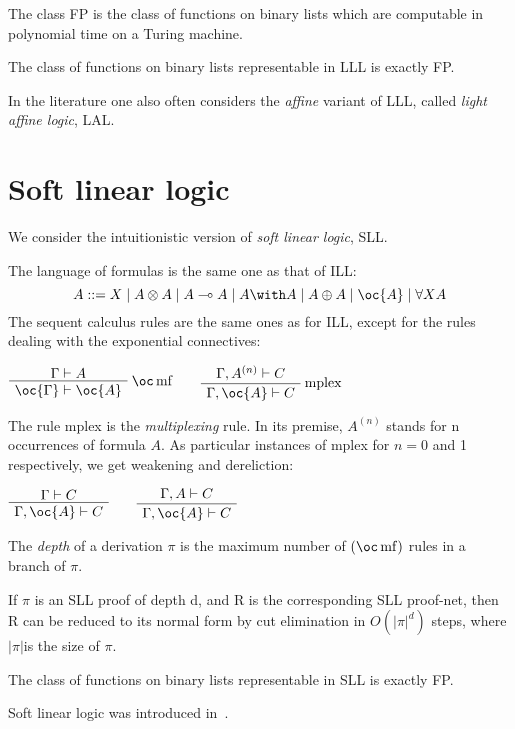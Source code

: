 The class FP is the class of functions on binary lists which are
computable in polynomial time on a Turing machine.

\begin{theorem}
The class of functions on binary lists representable in LLL is exactly FP.
\end{theorem}

In the literature one also often considers the \emph{affine} variant of
LLL, called \emph{light affine logic}, LAL.

\section{Soft linear logic}\label{soft-linear-logic}

We consider the intuitionistic version of \emph{soft linear logic}, SLL.

The language of formulas is the same one as that of ILL:
\begin{equation*}
A ::= X \mid A\tens A \mid A\limp A \mid A\with A \mid  A\plus A   \mid \oc{A} \mid \forall X A
\end{equation*}
The sequent calculus rules are the same ones as for ILL, except for the
rules dealing with the exponential connectives:

\(\AxRule{\Gamma\vdash A}
\LabelRule{\oc\rulename{mf} }
\UnaRule{\oc{\Gamma}\vdash\oc{A}}
\DisplayProof
\qquad
\AxRule{\Gamma,A^{(n)}\vdash C}
\LabelRule{\rulename{mplex}}
\UnaRule{\Gamma,\oc{A}\vdash C}
\DisplayProof\)

The rule mplex is the \emph{multiplexing} rule. In its premise,
\(A^{(n)}\) stands for n occurrences of formula \(A\). As particular
instances of mplex for \(n=0\) and 1 respectively, we get weakening and
dereliction:

\(\AxRule{\Gamma \vdash C}
\UnaRule{\Gamma,\oc{A}\vdash C}
\DisplayProof
\qquad
\AxRule{\Gamma,A\vdash C}
\UnaRule{\Gamma,\oc{A}\vdash C}
\DisplayProof\)

The \emph{depth} of a derivation \(\pi\) is the maximum number of
\((\oc\rulename{mf})\) rules in a branch of \(\pi\).

\begin{theorem}
If $\pi$ is an SLL proof of depth d, and R is the corresponding SLL proof-net, then R can be reduced to its normal form by cut elimination in   $ O(|\pi|^d)$ steps, where $|\pi|$is the size of $\pi$.
\end{theorem}

\begin{theorem}
The class of functions on binary lists representable in SLL is exactly FP.
\end{theorem}

Soft linear logic was introduced in~\cite{softlinearlogic}.


